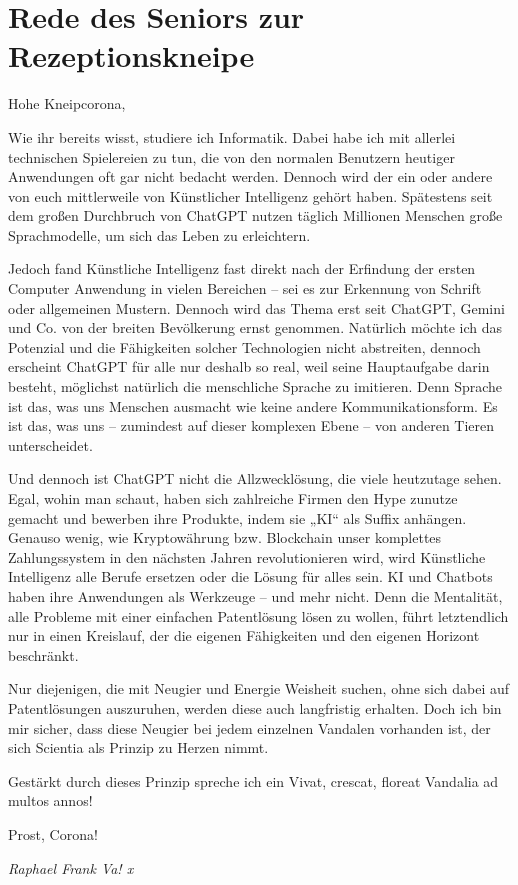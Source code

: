 \section{Rede des Seniors zur Rezeptionskneipe}
Hohe Kneipcorona,
\begin{multicols}{2}
Wie ihr bereits wisst, studiere ich Informatik. Dabei habe ich mit allerlei
technischen Spielereien zu tun, die von den normalen Benutzern heutiger
Anwendungen oft gar nicht bedacht werden. Dennoch wird der ein oder andere von euch mittlerweile von Künstlicher
Intelligenz gehört haben. Spätestens seit dem großen Durchbruch von ChatGPT
nutzen täglich Millionen Menschen große Sprachmodelle, um sich das Leben zu
erleichtern.

Jedoch fand Künstliche Intelligenz fast
direkt nach der Erfindung der ersten Computer Anwendung in vielen Bereichen –
sei es zur Erkennung von Schrift oder allgemeinen Mustern. Dennoch wird das
Thema erst seit ChatGPT, Gemini und Co. von der breiten Bevölkerung ernst
genommen. Natürlich möchte ich das Potenzial und die Fähigkeiten solcher
Technologien nicht abstreiten, dennoch erscheint ChatGPT für alle nur deshalb
so real, weil seine Hauptaufgabe darin besteht, möglichst natürlich die
menschliche Sprache zu imitieren. Denn Sprache ist das, was uns Menschen
ausmacht wie keine andere Kommunikationsform. Es ist das, was uns – zumindest
auf dieser komplexen Ebene – von anderen Tieren unterscheidet.

Und dennoch ist ChatGPT nicht die
Allzwecklösung, die viele heutzutage sehen. Egal, wohin man schaut, haben sich
zahlreiche Firmen den Hype zunutze gemacht und bewerben ihre Produkte, indem
sie „KI“ als Suffix anhängen. Genauso wenig, wie Kryptowährung bzw. Blockchain
unser komplettes Zahlungssystem in den nächsten Jahren revolutionieren wird,
wird Künstliche Intelligenz alle Berufe ersetzen oder die Lösung für alles
sein. KI und Chatbots haben ihre Anwendungen als Werkzeuge – und mehr nicht.
Denn die Mentalität, alle Probleme mit einer einfachen Patentlösung lösen zu
wollen, führt letztendlich nur in einen Kreislauf, der die eigenen Fähigkeiten
und den eigenen Horizont beschränkt.

Nur diejenigen, die mit Neugier und
Energie Weisheit suchen, ohne sich dabei auf Patentlösungen auszuruhen, werden
diese auch langfristig erhalten. Doch ich bin mir sicher, dass diese Neugier
bei jedem einzelnen Vandalen vorhanden ist, der sich Scientia als Prinzip zu
Herzen nimmt.

Gestärkt durch dieses Prinzip spreche ich
ein Vivat, crescat, floreat Vandalia ad multos annos!

Prost, Corona!

	\begin{flushright}
		\hfill\emph{Raphael Frank Va! x}
	\end{flushright}
\end{multicols}

